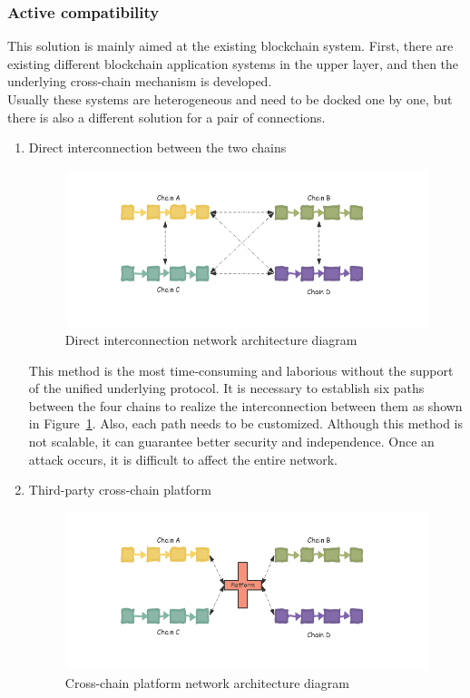 \subsubsection{Active compatibility}
\noindent This solution is mainly aimed at the existing blockchain system. First, there are existing different blockchain application systems in the upper layer, and then the underlying cross-chain mechanism is developed.\\
\noindent Usually these systems are heterogeneous and need to be docked one by one, but there is also a different solution for a pair of connections.
\begin{enumerate}
    \item Direct interconnection between the two chains
        \begin{figure}[H]
        \includegraphics[width=1\textwidth]{./figures/direct.png}
        \centering
        \caption{Direct interconnection network architecture diagram}
        \centering
        \label{fig:direct}
        
        \end{figure}
   This method is the most time-consuming and laborious without the support of the unified underlying protocol. It is necessary to establish six paths between the four chains to realize the interconnection between them as shown in Figure~\ref{fig:direct}. Also, each path needs to be customized. Although this method is not scalable, it can guarantee better security and independence. Once an attack occurs, it is difficult to affect the entire network.
    \item Third-party cross-chain platform
      \begin{figure}[H]
        \includegraphics[width=1\textwidth]{./figures/platform.png}
        \centering
        \caption{Cross-chain platform network architecture diagram}
        \centering
        \label{fig:platform}
        

\end{figure}
\end{enumerate}

